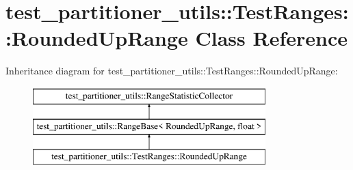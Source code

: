 \hypertarget{classtest__partitioner__utils_1_1TestRanges_1_1RoundedUpRange}{}\section{test\+\_\+partitioner\+\_\+utils\+:\+:Test\+Ranges\+:\+:Rounded\+Up\+Range Class Reference}
\label{classtest__partitioner__utils_1_1TestRanges_1_1RoundedUpRange}
Inheritance diagram for test\+\_\+partitioner\+\_\+utils\+:\+:Test\+Ranges\+:\+:Rounded\+Up\+Range\+:\begin{figure}[H]
\begin{center}
\leavevmode
\includegraphics[height=3.000000cm]{classtest__partitioner__utils_1_1TestRanges_1_1RoundedUpRange}
\end{center}
\end{figure}
